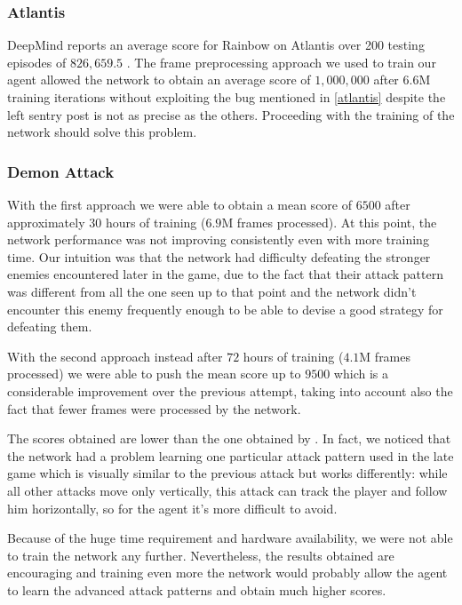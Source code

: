 \documentclass[10pt,twocolumn,letterpaper]{article}
\begin{document}
\subsubsection{Atlantis}
DeepMind reports an average score for Rainbow on Atlantis over 200 testing episodes of $826,659.5$ \cite{DBLP:journals/corr/abs-1710-02298}. The frame preprocessing approach we used to train our agent allowed the network to obtain an average score of $1,000,000$ after $6.6$M training iterations without exploiting the bug mentioned in \ref{atlantis} despite the left sentry post is not as precise as the others.  Proceeding with the training of the network should solve this problem.

\subsubsection{Demon Attack} 
With the first approach we were able to obtain a mean score of $6500$ after approximately $30$ hours of training ($6.9$M frames processed). At this point, the network performance was not improving consistently even with more training time. Our intuition was that the network had difficulty defeating the stronger enemies encountered later in the game, due to the fact that their attack pattern was different from all the one seen up to that point and the network didn't encounter this enemy frequently enough to be able to devise a good strategy for defeating them.

With the second approach instead after $72$ hours of training ($4.1$M frames processed) we were able to push the mean score up to $9500$ which is a considerable improvement over the previous attempt, taking into account also the fact that fewer frames were processed by the network.

The scores obtained are lower than the one obtained by \cite{DBLP:journals/corr/abs-1710-02298}. In fact, we noticed that the network had a problem learning one particular attack pattern used in the late game which is visually similar to the previous attack but works differently: while all other attacks move only vertically, this attack can track the player and follow him horizontally, so for the agent it's more difficult to avoid.

Because of the huge time requirement and hardware availability, we were not able to train the network any further. Nevertheless, the results obtained are encouraging and training even more the network would probably allow the agent to learn the advanced attack patterns and obtain much higher scores.

{\small


}
\end{document}
